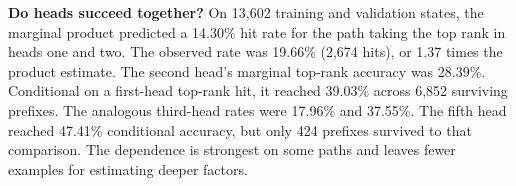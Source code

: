 \textbf{Do heads succeed together?} On 13,602 training and validation states, the marginal product predicted a 14.30\% hit rate for the path taking the top rank in heads one and two. The observed rate was 19.66\% (2,674 hits), or 1.37 times the product estimate. The second head's marginal top-rank accuracy was 28.39\%. Conditional on a first-head top-rank hit, it reached 39.03\% across 6,852 surviving prefixes. The analogous third-head rates were 17.96\% and 37.55\%. The fifth head reached 47.41\% conditional accuracy, but only 424 prefixes survived to that comparison. The dependence is strongest on some paths and leaves fewer examples for estimating deeper factors.

